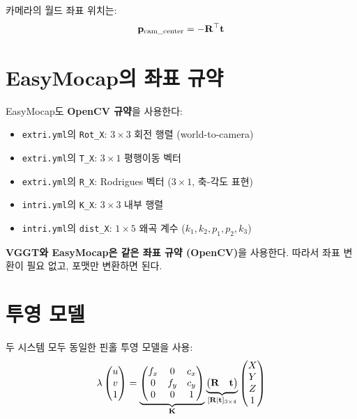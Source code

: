\documentclass[11pt, a4paper]{report}
\begin{document}
카메라의 월드 좌표 위치는:
\begin{equation}
\mathbf{p}_\text{cam\_center} = -\mathbf{R}^\top \mathbf{t}
\end{equation}

\section{EasyMocap의 좌표 규약}

EasyMocap도 \textbf{OpenCV 규약}을 사용한다:
\begin{itemize}[leftmargin=*]
  \item \texttt{extri.yml}의 \texttt{Rot\_X}: $3 \times 3$ 회전 행렬 (world-to-camera)
  \item \texttt{extri.yml}의 \texttt{T\_X}: $3 \times 1$ 평행이동 벡터
  \item \texttt{extri.yml}의 \texttt{R\_X}: Rodrigues 벡터 ($3 \times 1$, 축-각도 표현)
  \item \texttt{intri.yml}의 \texttt{K\_X}: $3 \times 3$ 내부 행렬
  \item \texttt{intri.yml}의 \texttt{dist\_X}: $1 \times 5$ 왜곡 계수 ($k_1, k_2, p_1, p_2, k_3$)
\end{itemize}

\begin{summary}
\textbf{VGGT와 EasyMocap은 같은 좌표 규약 (OpenCV)}을 사용한다.
따라서 좌표 변환이 필요 없고, 포맷만 변환하면 된다.
\end{summary}


\section{투영 모델}

두 시스템 모두 동일한 핀홀 투영 모델을 사용:
\begin{equation}
\lambda \begin{pmatrix} u \\ v \\ 1 \end{pmatrix}
= \underbrace{\begin{pmatrix} f_x & 0 & c_x \\ 0 & f_y & c_y \\ 0 & 0 & 1 \end{pmatrix}}_{\mathbf{K}}
\underbrace{\begin{pmatrix} \mathbf{R} & \mathbf{t} \end{pmatrix}}_{[\mathbf{R}|\mathbf{t}]_\text{3$\times$4}}
\begin{pmatrix} X \\ Y \\ Z \\ 1 \end{pmatrix}
\end{equation}
\end{document}
